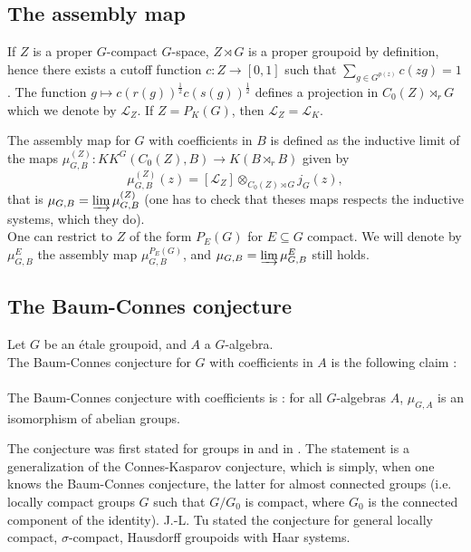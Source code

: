 \subsection{The assembly map}

If $Z$ is a proper $G$-compact $G$-space, $Z\rtimes G$ is a proper groupoid by definition, hence there exists a cutoff function $c : Z\rightarrow [0,1]$ such that $\sum_{g\in G^{p(z)}} c(zg) = 1$. The function $g\mapsto c(r(g))^{\frac{1}{2}}c(s(g))^{\frac{1}{2}} $ defines a projection in $C_0(Z)\rtimes_r G$ which we denote by $\mathcal L_Z$. If $Z=P_K(G)$, then $\mathcal L_Z = \mathcal L_K$.

\begin{definition}
The assembly map for $G$ with coefficients in $B$ is defined as the inductive limit of the maps $\mu_{G,B}^{(Z)} : KK^G(C_0(Z),B)\rightarrow K(B\rtimes_r B)$ given by
\[\mu_{G,B}^{(Z)} (z)=[\mathcal L_Z]\otimes_{C_0(Z)\rtimes G} j_G(z),\]
that is $\mu_{G,B} = \varinjlim \mu_{G,B}^{(Z)}$ (one has to check that theses maps respects the inductive systems, which they do).\\
One can restrict to $Z$ of the form $P_E(G)$ for $E\subseteq G$ compact. We will denote by $\mu_{G,B}^E$ the assembly map $\mu_{G,B}^{P_E(G)}$, and $\mu_{G,B} = \varinjlim \mu_{G,B}^{E}$ still holds.
\end{definition}


\subsection{The Baum-Connes conjecture}

\begin{conj}
Let $G$ be an étale groupoid, and $A$ a $G$-algebra.\\
The Baum-Connes conjecture for $G$ with coefficients in $A$ is the following claim : \\
\\
The Baum-Connes conjecture with coefficients is : for all $G$-algebras $A$, $\mu_{G,A}$ is an isomorphism of abelian groups.
\end{conj}

The conjecture was first stated for groups in \cite{BaumConnes} and in \cite{BaumConnesHigson}. The statement is a generalization of the Connes-Kasparov conjecture, which is simply, when one knows the Baum-Connes conjecture, the latter for almost connected groups (i.e. locally compact groups $G$ such that $G/G_0$ is compact, where $G_0$ is the connected component of the identity). J.-L. Tu stated the conjecture for general locally compact, $\sigma$-compact, Hausdorff groupoids with Haar systems.\cite{TuBC} \\

